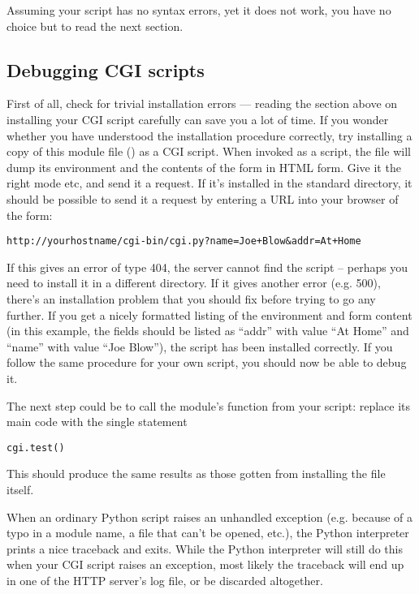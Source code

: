 Assuming your script has no syntax errors, yet it does not work, you
have no choice but to read the next section.


\subsection{Debugging CGI scripts}

First of all, check for trivial installation errors --- reading the
section above on installing your CGI script carefully can save you a
lot of time.  If you wonder whether you have understood the
installation procedure correctly, try installing a copy of this module
file () as a CGI script.  When invoked as a script, the file
will dump its environment and the contents of the form in HTML form.
Give it the right mode etc, and send it a request.  If it's installed
in the standard  directory, it should be possible to send it a
request by entering a URL into your browser of the form:

\begin{verbatim}
http://yourhostname/cgi-bin/cgi.py?name=Joe+Blow&addr=At+Home
\end{verbatim}

If this gives an error of type 404, the server cannot find the script
-- perhaps you need to install it in a different directory.  If it
gives another error (e.g.  500), there's an installation problem that
you should fix before trying to go any further.  If you get a nicely
formatted listing of the environment and form content (in this
example, the fields should be listed as ``addr'' with value ``At Home''
and ``name'' with value ``Joe Blow''), the  script has been
installed correctly.  If you follow the same procedure for your own
script, you should now be able to debug it.

The next step could be to call the  module's
 function from your script: replace its main code
with the single statement

\begin{verbatim}
cgi.test()
\end{verbatim}

This should produce the same results as those gotten from installing
the  file itself.

When an ordinary Python script raises an unhandled exception
(e.g. because of a typo in a module name, a file that can't be opened,
etc.), the Python interpreter prints a nice traceback and exits.
While the Python interpreter will still do this when your CGI script
raises an exception, most likely the traceback will end up in one of
the HTTP server's log file, or be discarded altogether.

